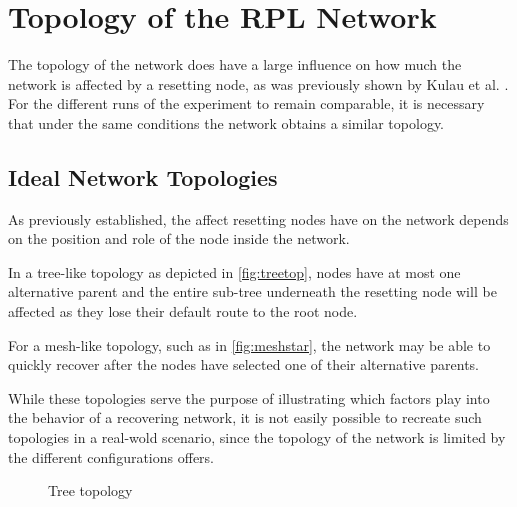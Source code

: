 \section{Topology of the RPL Network}

The topology of the network does have a large influence on how much the network
is affected by a resetting node, as was previously shown by Kulau et al. \cite{kulau2017energy}.
For the different runs of the experiment to remain comparable, it is necessary
that under the same conditions the network obtains a similar topology.

\subsection{Ideal Network Topologies}

As previously established, the affect resetting nodes have on the network
depends on the position and role of the node inside the network.

In a tree-like topology as depicted in \autoref{fig:treetop}, nodes have at most
one alternative parent and the entire sub-tree underneath the resetting node
will be affected as they lose their default route to the root node.

For a mesh-like topology, such as in \autoref{fig:meshstar}, the network may be
able to quickly recover after the nodes have selected one of their alternative
parents.

While these topologies serve the purpose of illustrating which factors play into
the behavior of a recovering network, it is not easily possible to recreate such
topologies in a real-wold scenario, since the topology of the network is limited
by the different configurations \fitlab offers.

\begin{figure}
  \centering
  \caption{Tree topology}
  \label{fig:treetop}
\end{figure}

